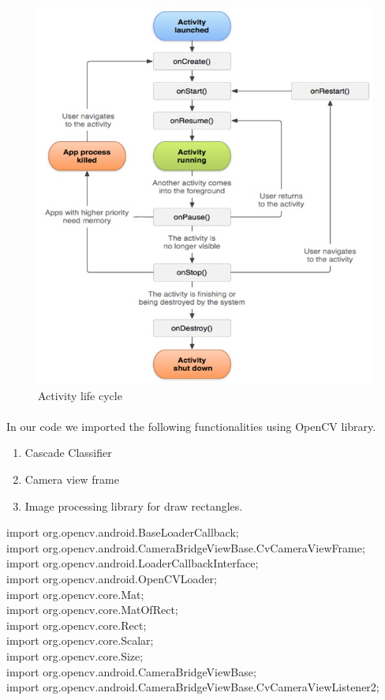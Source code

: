 \documentclass[10pt,a4paper,twoside]{report}
\begin{document}
\begin{appendix}
\begin{figure}[htpb]
\begin{center}
\includegraphics[scale=.6]{analysis}
\caption{Activity life cycle}

\end{center}
\end{figure}
\paragraph{ }In our code we imported the following functionalities using OpenCV library.
\begin{enumerate}
\item Cascade Classifier
\item Camera view frame
\item Image processing library for draw rectangles.

\end{enumerate}
\begin{flushleft}

import org.opencv.android.BaseLoaderCallback;\\
import org.opencv.android.CameraBridgeViewBase.CvCameraViewFrame;\\
import org.opencv.android.LoaderCallbackInterface;\\
import org.opencv.android.OpenCVLoader;\\
import org.opencv.core.Mat;\\
import org.opencv.core.MatOfRect;\\
import org.opencv.core.Rect;\\
import org.opencv.core.Scalar;\\
import org.opencv.core.Size;\\
import org.opencv.android.CameraBridgeViewBase;\\
import org.opencv.android.CameraBridgeViewBase.CvCameraViewListener2;


\end{flushleft}
\end{appendix}
\end{document}
